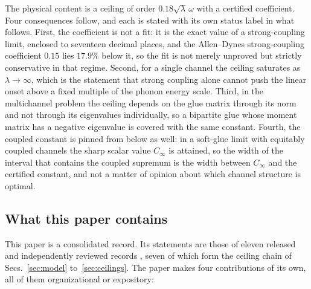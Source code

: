 \documentclass[aps,10pt,superscriptaddress,floatfix,amsmath,amssymb,nofootinbib]{revtex4-2}
\newcommand{\Cinf}{C_\infty}
\begin{document}
The physical content is a ceiling of order $0.18\sqrt{\lambda}\,\omega$ with a certified
coefficient. Four consequences follow, and each is stated with its own status label in
what follows. First, the coefficient is not a fit: it is the exact value of a
strong-coupling limit, enclosed to seventeen decimal places, and the Allen--Dynes
strong-coupling coefficient $0.15$ lies $17.9\%$ below it, so the fit is not merely unproved but
strictly conservative in that regime. Second, for a single channel the ceiling saturates
as $\lambda\to\infty$, which is the statement that strong coupling alone cannot push the
linear onset above a fixed multiple of the phonon energy scale. Third, in the multichannel
problem the ceiling depends on the glue matrix through its norm and not through its
eigenvalues individually, so a bipartite glue whose moment matrix has a negative
eigenvalue is covered with the same constant. Fourth, the coupled constant is pinned from
below as well: in a soft-glue limit with equitably coupled channels the sharp scalar value
$\Cinf$ is attained, so the width of the interval that contains the coupled supremum is
the width between $\Cinf$ and the certified constant, and not a matter of opinion about
which channel structure is optimal.

\subsection{What this paper contains}

This paper is a consolidated record. Its statements are those of eleven released and
independently reviewed records
\cite{finiteband,gamma,univglue,optimum,finiteenergy,anisosharp,msvertex,cutoff,slowphonon,limits,capstone},
seven of which form the ceiling chain of Secs.~\ref{sec:model} to~\ref{sec:ceilings}. The
paper makes four contributions of its own, all of them organizational or expository:
\end{document}
